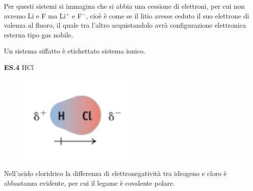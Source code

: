 Per questi sistemi si immagina che si abbia una cessione di elettroni, per cui non avremo Li e F ma Li$^+$ e F$^-$, cioè è come se il litio avesse ceduto il suo elettrone di valenza al fluoro, il quale tra l'altro acquistandolo avrà configurazione elettronica esterna tipo gas nobile.

Un sistema siffatto è etichettato sistema ionico.

\vspace{0.2cm}\textbf{ES.4} HCl

\vspace{-0.4cm}\begin{figure}[htp]
    \centering
    \includegraphics[width=6cm]{immagini/HCl.png}
\end{figure}

\vspace{-0.4cm}Nell'acido cloridrico la differenza di elettronegatività tra idrogeno e cloro è abbastanza evidente, per cui il legame è covalente polare.

